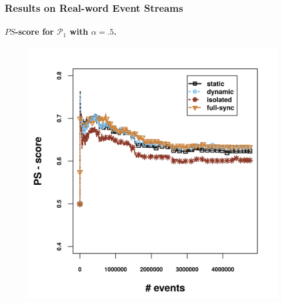 \begin{frame}
	
	\frametitle{Results on Real-word Event Streams }
	\framesubtitle{$PS$-score for $\mathcal{P}_1$ with $\alpha = .5$.}
	
\begin{center}
	\centering
	\begin{figure}[]
		
		\includegraphics[width=.9\textwidth,height=.8\textheight]{../chapters/figures/synopses/new/ps_score_p1.png}
		
	\end{figure}
\end{center}
\end{frame}

